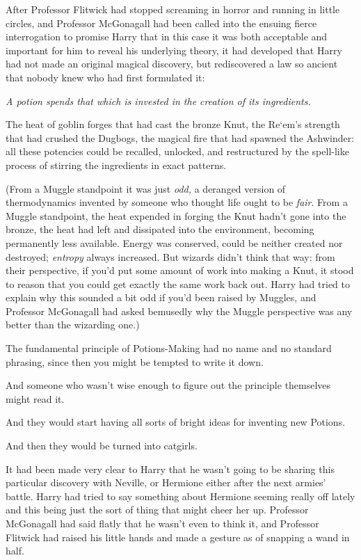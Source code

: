 After Professor Flitwick had stopped screaming in horror and running in little
circles, and Professor McGonagall had been called into the ensuing fierce
interrogation to promise Harry that in this case it was both acceptable and
important for him to reveal his underlying theory, it had developed that Harry
had not made an original magical discovery, but rediscovered a law so ancient
that nobody knew who had first formulated it:

\emph{A potion spends that which is invested in the creation of its
ingredients.}

The heat of goblin forges that had cast the bronze Knut, the Re`em's strength
that had crushed the Dugbogs, the magical fire that had spawned the Ashwinder:
all these potencies could be recalled, unlocked, and restructured by the
spell-like process of stirring the ingredients in exact patterns.

(From a Muggle standpoint it was just \emph{odd,} a deranged version of
thermodynamics invented by someone who thought life ought to be \emph{fair}.
From a Muggle standpoint, the heat expended in forging the Knut hadn't gone
into the bronze, the heat had left and dissipated into the environment,
becoming permanently less available. Energy was conserved, could be neither
created nor destroyed; \emph{entropy} always increased. But wizards didn't
think that way: from their perspective, if you'd put some amount of work into
making a Knut, it stood to reason that you could get exactly the same work back
out. Harry had tried to explain why this sounded a bit odd if you'd been raised
by Muggles, and Professor McGonagall had asked bemusedly why the Muggle
perspective was any better than the wizarding one.)

The fundamental principle of Potions-Making had no name and no standard
phrasing, since then you might be tempted to write it down.

And someone who wasn't wise enough to figure out the principle themselves might
read it.

And they would start having all sorts of bright ideas for inventing new Potions.

And then they would be turned into catgirls.

It had been made very clear to Harry that he wasn't going to be sharing this
particular discovery with Neville, or Hermione either after the next armies'
battle. Harry had tried to say something about Hermione seeming really off
lately and this being just the sort of thing that might cheer her up. Professor
McGonagall had said flatly that he wasn't even to think it, and Professor
Flitwick had raised his little hands and made a gesture as of snapping a wand
in half.

